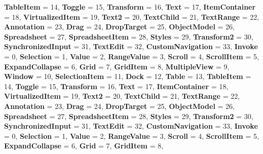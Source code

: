 \begin{DoxyCompactItemize}
{\bfseries Table\+Item} = 14, 
{\bfseries Toggle} = 15, 
{\bfseries Transform} = 16, 
{\bfseries Text} = 17, 
\newline
{\bfseries Item\+Container} = 18, 
{\bfseries Virtualized\+Item} = 19, 
{\bfseries Text2} = 20, 
{\bfseries Text\+Child} = 21, 
\newline
{\bfseries Text\+Range} = 22, 
{\bfseries Annotation} = 23, 
{\bfseries Drag} = 24, 
{\bfseries Drop\+Target} = 25, 
\newline
{\bfseries Object\+Model} = 26, 
{\bfseries Spreadsheet} = 27, 
{\bfseries Spreadsheet\+Item} = 28, 
{\bfseries Styles} = 29, 
\newline
{\bfseries Transform2} = 30, 
{\bfseries Synchronized\+Input} = 31, 
{\bfseries Text\+Edit} = 32, 
{\bfseries Custom\+Navigation} = 33, 
\newline
{\bfseries Invoke} = 0, 
{\bfseries Selection} = 1, 
{\bfseries Value} = 2, 
{\bfseries Range\+Value} = 3, 
\newline
{\bfseries Scroll} = 4, 
{\bfseries Scroll\+Item} = 5, 
{\bfseries Expand\+Collapse} = 6, 
{\bfseries Grid} = 7, 
\newline
{\bfseries Grid\+Item} = 8, 
{\bfseries Multiple\+View} = 9, 
{\bfseries Window} = 10, 
{\bfseries Selection\+Item} = 11, 
\newline
{\bfseries Dock} = 12, 
{\bfseries Table} = 13, 
{\bfseries Table\+Item} = 14, 
{\bfseries Toggle} = 15, 
\newline
{\bfseries Transform} = 16, 
{\bfseries Text} = 17, 
{\bfseries Item\+Container} = 18, 
{\bfseries Virtualized\+Item} = 19, 
\newline
{\bfseries Text2} = 20, 
{\bfseries Text\+Child} = 21, 
{\bfseries Text\+Range} = 22, 
{\bfseries Annotation} = 23, 
\newline
{\bfseries Drag} = 24, 
{\bfseries Drop\+Target} = 25, 
{\bfseries Object\+Model} = 26, 
{\bfseries Spreadsheet} = 27, 
\newline
{\bfseries Spreadsheet\+Item} = 28, 
{\bfseries Styles} = 29, 
{\bfseries Transform2} = 30, 
{\bfseries Synchronized\+Input} = 31, 
\newline
{\bfseries Text\+Edit} = 32, 
{\bfseries Custom\+Navigation} = 33, 
{\bfseries Invoke} = 0, 
{\bfseries Selection} = 1, 
\newline
{\bfseries Value} = 2, 
{\bfseries Range\+Value} = 3, 
{\bfseries Scroll} = 4, 
{\bfseries Scroll\+Item} = 5, 
\newline
{\bfseries Expand\+Collapse} = 6, 
{\bfseries Grid} = 7, 
{\bfseries Grid\+Item} = 8, 

\end{DoxyCompactItemize}
